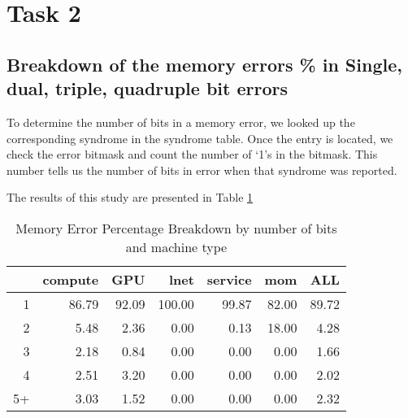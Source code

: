 \section{Task 2}

\subsection{Breakdown of the memory errors \% in Single, dual, triple, quadruple bit errors}

To determine the number of bits in a memory error, we looked up the
corresponding syndrome in the syndrome table.  Once the entry is located, we check the error bitmask and count the number of `1's in the bitmask.  This number tells us the number of bits in error when that syndrome was reported.

The results of this study are presented in Table \ref{tab:mem_breakdown}


\begin{table}[ht]
\centering
\caption{Memory Error Percentage Breakdown by number of bits and machine type}
\label{tab:mem_breakdown}
\begin{tabular}{rrrrrrr}
  \hline
 & compute & GPU & lnet & service & mom & ALL \\
  \hline
1 & 86.79 & 92.09 & 100.00 & 99.87 & 82.00 & 89.72 \\
  2 & 5.48 & 2.36 & 0.00 & 0.13 & 18.00 & 4.28 \\
  3 & 2.18 & 0.84 & 0.00 & 0.00 & 0.00 & 1.66 \\
  4 & 2.51 & 3.20 & 0.00 & 0.00 & 0.00 & 2.02 \\
  5+ & 3.03 & 1.52 & 0.00 & 0.00 & 0.00 & 2.32 \\
   \hline
\end{tabular}
\end{table}
